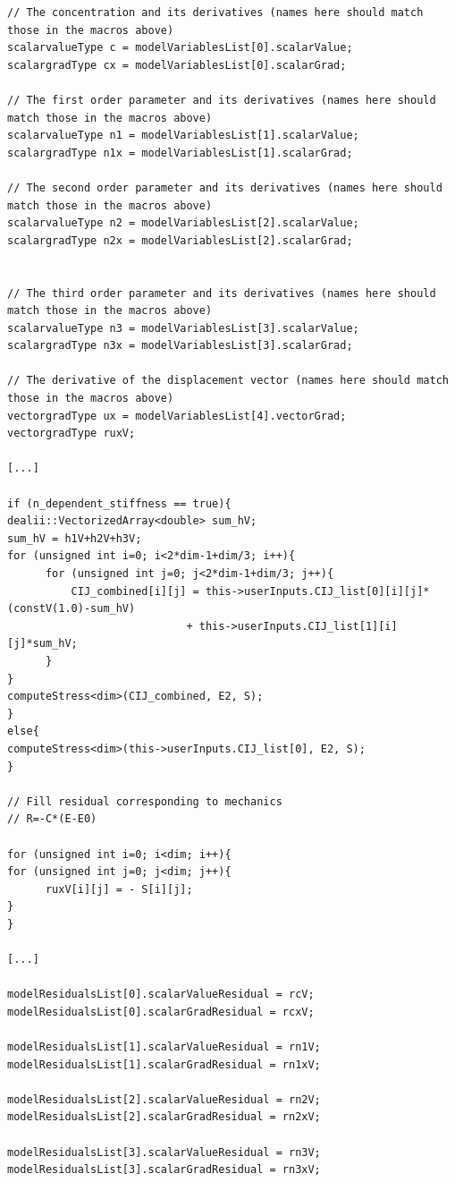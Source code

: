 \documentclass[10pt]{article} %
\begin{document}
\begin{lstlisting}
// The concentration and its derivatives (names here should match those in the macros above)
scalarvalueType c = modelVariablesList[0].scalarValue;
scalargradType cx = modelVariablesList[0].scalarGrad;

// The first order parameter and its derivatives (names here should match those in the macros above)
scalarvalueType n1 = modelVariablesList[1].scalarValue;
scalargradType n1x = modelVariablesList[1].scalarGrad;

// The second order parameter and its derivatives (names here should match those in the macros above)
scalarvalueType n2 = modelVariablesList[2].scalarValue;
scalargradType n2x = modelVariablesList[2].scalarGrad;


// The third order parameter and its derivatives (names here should match those in the macros above)
scalarvalueType n3 = modelVariablesList[3].scalarValue;
scalargradType n3x = modelVariablesList[3].scalarGrad;

// The derivative of the displacement vector (names here should match those in the macros above)
vectorgradType ux = modelVariablesList[4].vectorGrad;
vectorgradType ruxV;

[...]

if (n_dependent_stiffness == true){
dealii::VectorizedArray<double> sum_hV;
sum_hV = h1V+h2V+h3V;
for (unsigned int i=0; i<2*dim-1+dim/3; i++){
	  for (unsigned int j=0; j<2*dim-1+dim/3; j++){
		  CIJ_combined[i][j] = this->userInputs.CIJ_list[0][i][j]*(constV(1.0)-sum_hV) 
		  					+ this->userInputs.CIJ_list[1][i][j]*sum_hV;
	  }
}
computeStress<dim>(CIJ_combined, E2, S);
}
else{
computeStress<dim>(this->userInputs.CIJ_list[0], E2, S);
}

// Fill residual corresponding to mechanics
// R=-C*(E-E0)

for (unsigned int i=0; i<dim; i++){
for (unsigned int j=0; j<dim; j++){
	  ruxV[i][j] = - S[i][j];
}
}

[...]

modelResidualsList[0].scalarValueResidual = rcV;
modelResidualsList[0].scalarGradResidual = rcxV;

modelResidualsList[1].scalarValueResidual = rn1V;
modelResidualsList[1].scalarGradResidual = rn1xV;

modelResidualsList[2].scalarValueResidual = rn2V;
modelResidualsList[2].scalarGradResidual = rn2xV;

modelResidualsList[3].scalarValueResidual = rn3V;
modelResidualsList[3].scalarGradResidual = rn3xV;


\end{lstlisting}
\end{document}
